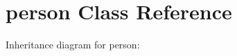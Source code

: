 \hypertarget{classperson}{}\section{person Class Reference}
\label{classperson}


Inheritance diagram for person\+:

